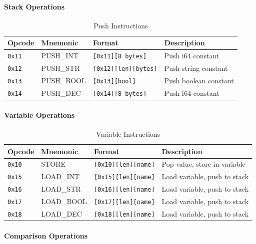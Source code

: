\documentclass[11pt,a4paper]{article}
\begin{document}
\paragraph{Stack Operations}

\begin{table}[h]
\centering
\begin{tabular}{@{}llll@{}}
\toprule
Opcode & Mnemonic & Format & Description \\
\midrule
\texttt{0x11} & PUSH\_INT & \texttt{[0x11][8 bytes]} & Push i64 constant \\
\texttt{0x12} & PUSH\_STR & \texttt{[0x12][len][bytes]} & Push string constant \\
\texttt{0x13} & PUSH\_BOOL & \texttt{[0x13][bool]} & Push boolean constant \\
\texttt{0x14} & PUSH\_DEC & \texttt{[0x14][8 bytes]} & Push f64 constant \\
\bottomrule
\end{tabular}
\caption{Push Instructions}
\end{table}

\paragraph{Variable Operations}

\begin{table}[h]
\centering
\begin{tabular}{@{}llll@{}}
\toprule
Opcode & Mnemonic & Format & Description \\
\midrule
\texttt{0x10} & STORE & \texttt{[0x10][len][name]} & Pop value, store in variable \\
\texttt{0x15} & LOAD\_INT & \texttt{[0x15][len][name]} & Load variable, push to stack \\
\texttt{0x16} & LOAD\_STR & \texttt{[0x16][len][name]} & Load variable, push to stack \\
\texttt{0x17} & LOAD\_BOOL & \texttt{[0x17][len][name]} & Load variable, push to stack \\
\texttt{0x18} & LOAD\_DEC & \texttt{[0x18][len][name]} & Load variable, push to stack \\
\bottomrule
\end{tabular}
\caption{Variable Instructions}
\end{table}

\paragraph{Comparison Operations}
\end{document}

